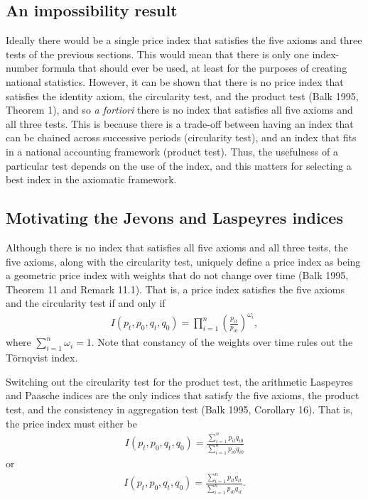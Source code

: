 \documentclass[]{article}
\begin{document}
\hypertarget{an-impossibility-result}{%
\subsection{An impossibility result}\label{an-impossibility-result}}

Ideally there would be a single price index that satisfies the five axioms and three tests of the previous sections. This would mean that there is only one index-number formula that should ever be used, at least for the purposes of creating national statistics. However, it can be shown that there is no price index that satisfies the identity axiom, the circularity test, and the product test (Balk 1995, Theorem 1), and so \emph{a fortiori} there is no index that satisfies all five axioms and all three tests. This is because there is a trade-off between having an index that can be chained across successive periods (circularity test), and an index that fits in a national accounting framework (product test). Thus, the usefulness of a particular test depends on the use of the index, and this matters for selecting a best index in the axiomatic framework.

\hypertarget{motivating-the-jevons-and-laspeyres-indices}{%
\subsection{Motivating the Jevons and Laspeyres indices}\label{motivating-the-jevons-and-laspeyres-indices}}

Although there is no index that satisfies all five axioms and all three tests, the five axioms, along with the circularity test, uniquely define a price index as being a geometric price index with weights that do not change over time (Balk 1995, Theorem 11 and Remark 11.1). That is, a price index satisfies the five axioms and the circularity test if and only if
\begin{align*}
I(p_{t}, p_{0}, q_{t}, q_{0}) = \prod_{i = 1}^{n} \left(\frac{p_{it}}{p_{i0}}\right)^{\omega_{i}},
\end{align*}
where \(\sum_{i = 1}^{n} \omega_{i} = 1\). Note that constancy of the weights over time rules out the Törnqvist index.

Switching out the circularity test for the product test, the arithmetic Laspeyres and Paasche indices are the only indices that satisfy the five axioms, the product test, and the consistency in aggregation test (Balk 1995, Corollary 16). That is, the price index must either be
\begin{align*}
I(p_{t}, p_{0}, q_{t}, q_{0}) = \frac{\sum_{i = 1}^{n} p_{it}q_{i0}}{\sum_{i = 1}^{n} p_{i0}q_{i0}}
\end{align*}
or
\begin{align*}
I(p_{t}, p_{0}, q_{t}, q_{0}) = \frac{\sum_{i = 1}^{n} p_{it}q_{it}}{\sum_{i = 1}^{n} p_{i0}q_{it}}.
\end{align*}
\end{document}
